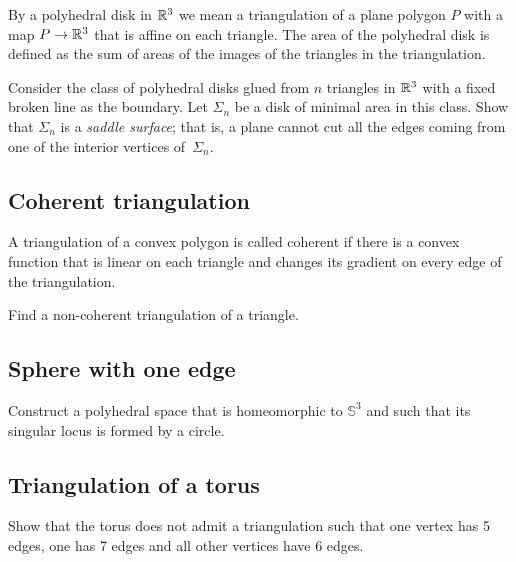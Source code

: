 By a polyhedral disk in $\mathbb{R}^3$
we mean a triangulation of a plane polygon $P$ with a map $P\to\mathbb{R}^3$ that is affine on each triangle.
The area of the polyhedral disk is defined as the sum of areas of the images of the triangles in the triangulation.

\begin{pr}
Consider the  class of polyhedral disks glued from $n$ triangles in $\mathbb{R}^3$ 
with a fixed broken line as the boundary.
Let $\Sigma_n$ be a disk of minimal area in this class.
Show that $\Sigma_n$ is a \emph{saddle surface};
that is, a plane cannot cut all the edges coming from one of the interior vertices of~$\Sigma_n$.
\end{pr}

\subsection*{Coherent triangulation\easy}\label{Coherent triangulation} 

A triangulation of a convex polygon is called coherent if there is a convex function that is linear on each triangle and changes its gradient on every edge of the triangulation.

\begin{pr}
Find a non-coherent triangulation of a triangle.
\end{pr}



\subsection*{Sphere with one edge\hard}\label{panov-S^3} 

\begin{pr}
Construct a polyhedral space that is homeomorphic to $\mathbb{S}^3$ and such that its singular locus is formed by a circle.
\end{pr}


\subsection*{Triangulation of a torus}\label{Triangulation of a torus}

\begin{pr}
Show that the torus does not admit a triangulation 
such that one vertex has 5 edges,
one has 7 edges and 
all other vertices have 
6 edges. 
\end{pr}


